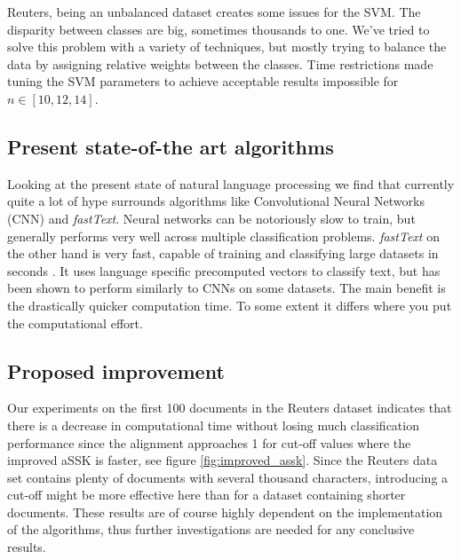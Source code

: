 Reuters, being an unbalanced dataset creates some issues for the SVM. The disparity between classes are big, sometimes thousands to one. We've tried to solve this problem with a variety of techniques, but mostly trying to balance the data by assigning relative weights between the classes. Time restrictions made tuning the SVM parameters to achieve acceptable results impossible for $ n \in [10,12,14] $. 



\subsection{Present state-of-the art algorithms}
Looking at the present state of natural language processing we find that currently quite a lot of hype surrounds algorithms like Convolutional Neural Networks (CNN) and \textit{fastText}. Neural networks can be notoriously slow to train, but generally performs very well across multiple classification problems. \textit{fastText} on the other hand is very fast, capable of training and classifying large datasets in seconds \cite{joulin2016bag}. It uses language specific precomputed vectors to classify text, but has been shown to perform similarly to CNNs on some datasets. The main benefit is the drastically quicker computation time. To some extent it differs where you put the computational effort.

\subsection{Proposed improvement}
Our experiments on the first 100 documents in the Reuters dataset indicates that there is a decrease in computational time without losing much classification performance since the alignment approaches 1 for cut-off values where the improved aSSK is faster, see figure \ref{fig:improved_assk}. Since the Reuters data set contains plenty of documents with several thousand characters, introducing a cut-off might be more effective here than for a dataset containing shorter documents. These results are of course highly dependent on the implementation of the algorithms, thus further investigations are needed for any conclusive results. 
